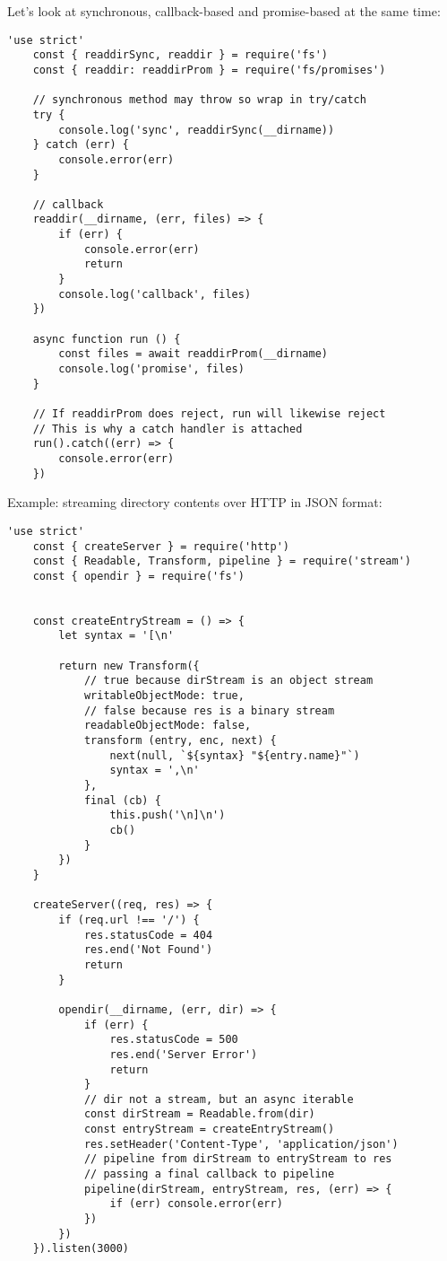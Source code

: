 \documentclass{scrartcl}
\begin{document}
 Let's look at synchronous, callback-based and promise-based at the same time:

\begin{lstlisting}[style=ES6]
    'use strict'
    const { readdirSync, readdir } = require('fs')
    const { readdir: readdirProm } = require('fs/promises')

    // synchronous method may throw so wrap in try/catch
    try {
        console.log('sync', readdirSync(__dirname))
    } catch (err) {
        console.error(err)
    }

    // callback
    readdir(__dirname, (err, files) => {
        if (err) {
            console.error(err)
            return
        }
        console.log('callback', files)
    })

    async function run () {
        const files = await readdirProm(__dirname)
        console.log('promise', files)
    }

    // If readdirProm does reject, run will likewise reject
    // This is why a catch handler is attached
    run().catch((err) => {
        console.error(err)
    })

\end{lstlisting}

Example: streaming directory contents over HTTP in JSON format:

\begin{lstlisting}[style=ES6]
    'use strict'
    const { createServer } = require('http')
    const { Readable, Transform, pipeline } = require('stream')
    const { opendir } = require('fs')


    const createEntryStream = () => {
        let syntax = '[\n'

        return new Transform({
            // true because dirStream is an object stream
            writableObjectMode: true,
            // false because res is a binary stream
            readableObjectMode: false,
            transform (entry, enc, next) {
                next(null, `${syntax} "${entry.name}"`)
                syntax = ',\n'
            },
            final (cb) {
                this.push('\n]\n')
                cb()
            }
        })
    }

    createServer((req, res) => {
        if (req.url !== '/') {
            res.statusCode = 404
            res.end('Not Found')
            return
        }

        opendir(__dirname, (err, dir) => {
            if (err) {
                res.statusCode = 500
                res.end('Server Error')
                return
            }
            // dir not a stream, but an async iterable
            const dirStream = Readable.from(dir)
            const entryStream = createEntryStream()
            res.setHeader('Content-Type', 'application/json')
            // pipeline from dirStream to entryStream to res
            // passing a final callback to pipeline
            pipeline(dirStream, entryStream, res, (err) => {
                if (err) console.error(err)
            })
        })
    }).listen(3000)
\end{lstlisting}
\end{document}
